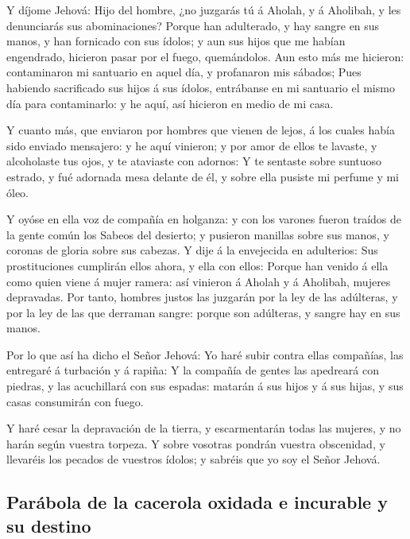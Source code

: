  Y díjome Jehová: Hijo del hombre, ¿no juzgarás tú á
Aholah, y á Aholibah, y les denunciarás sus abominaciones? 
Porque han adulterado, y hay sangre en sus manos, y han fornicado con
sus ídolos; y aun sus hijos que me habían engendrado, hicieron pasar por
el fuego, quemándolos.  Aun esto más me hicieron:
contaminaron mi santuario en aquel día, y profanaron mis sábados;
 Pues habiendo sacrificado sus hijos á sus ídolos,
entrábanse en mi santuario el mismo día para contaminarlo: y he aquí,
así hicieron en medio de mi casa.

 Y cuanto más, que enviaron por hombres que vienen de
lejos, á los cuales había sido enviado mensajero: y he aquí vinieron; y
por amor de ellos te lavaste, y alcoholaste tus ojos, y te ataviaste con
adornos:  Y te sentaste sobre suntuoso estrado, y fué
adornada mesa delante de él, y sobre ella pusiste mi perfume y mi óleo.

 Y oyóse en ella voz de compañía en holganza: y con los
varones fueron traídos de la gente común los Sabeos del desierto; y
pusieron manillas sobre sus manos, y coronas de gloria sobre sus
cabezas.  Y dije á la envejecida en adulterios: Sus
prostituciones cumplirán ellos ahora, y ella con ellos: 
Porque han venido á ella como quien viene á mujer ramera: así vinieron á
Aholah y á Aholibah, mujeres depravadas.  Por tanto,
hombres justos las juzgarán por la ley de las adúlteras, y por la ley de
las que derraman sangre: porque son adúlteras, y sangre hay en sus
manos.

 Por lo que así ha dicho el Señor Jehová: Yo haré subir
contra ellas compañías, las entregaré á turbación y á rapiña:
 Y la compañía de gentes las apedreará con piedras, y las
acuchillará con sus espadas: matarán á sus hijos y á sus hijas, y sus
casas consumirán con fuego.

 Y haré cesar la depravación de la tierra, y escarmentarán
todas las mujeres, y no harán según vuestra torpeza.  Y
sobre vosotras pondrán vuestra obscenidad, y llevaréis los pecados de
vuestros ídolos; y sabréis que yo soy el Señor Jehová.

\hypertarget{paruxe1bola-de-la-cacerola-oxidada-e-incurable-y-su-destino}{%
\subsection{Parábola de la cacerola oxidada e incurable y su
destino}\label{paruxe1bola-de-la-cacerola-oxidada-e-incurable-y-su-destino}}

